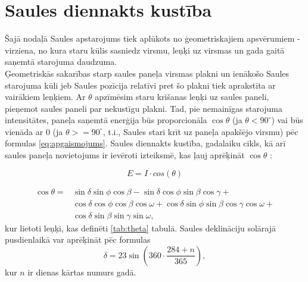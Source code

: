 
\section{Saules diennakts kustība}

Šajā nodaļā Saules apstarojums tiek aplūkots no ģeometriskajiem apsvērumiem - virziena, no kura staru kūlis sasniedz virsmu, leņķi uz virsmas un gada gaitā saņemtā starojuma daudzuma.\\
Ģeometriskās sakarības starp saules paneļa virsmas plakni un ienākošo Saules starojuma kūli jeb Saules pozīcija relatīvi pret šo plakni tiek aprakstīta ar vairākiem leņķiem. Ar $\theta$ apzīmēsim staru krišanas leņķi uz saules paneli, pieņemot saules paneli par nekustīgu plakni. Tad, pie nemainīgas starojuma intensitātes, paneļa saņemtā enerģija būs proporcionāla $\cos{\theta}$ (ja $\theta<90^\circ$) vai būs vienāda ar 0 (ja $\theta>=90^\circ$, t.i., Saules stari krīt uz paneļa apakšējo virsmu) pēc formulas \ref{eq:apgaismojums}. Saules diennakts kustība, gadalaiku cikls, kā arī saules paneļa novietojums ir ievēroti izteiksmē, kas ļauj aprēķināt $\cos{\theta}$ \cite{ThermalProcesses}:

\begin{equation}
\label{eq:apgaismojums}
E = I \cdot cos(\theta)
\end{equation}

\begin{equation}
\label{eq:theta}
\begin{aligned}
	\cos{\theta} = {} & \sin{\delta} \sin{\phi} \cos{\beta} - \sin{\delta} \cos{\phi} \sin{\beta} \cos{\gamma} +                           \\
	                  & \cos{\delta} \cos{\phi} \cos{\beta} \cos{\omega} + \cos{\delta} \sin{\phi} \sin{\beta} \cos{\gamma} \cos{\omega} + \\
	                  & \cos{\delta} \sin{\beta} \sin{\gamma} \sin{\omega},
\end{aligned}
\end{equation}
kur lietoti leņķi, kas definēti \ref{tab:theta} tabulā. Saules deklināciju solārajā pusdienlaikā var aprēķināt pēc formulas
\begin{equation}
\label{eq:delta}
    \delta = 23 \sin \left( 360 \cdot \frac{284+n}{365} \right),
\end{equation}
kur $n$ ir dienas kārtas numurs gadā.


